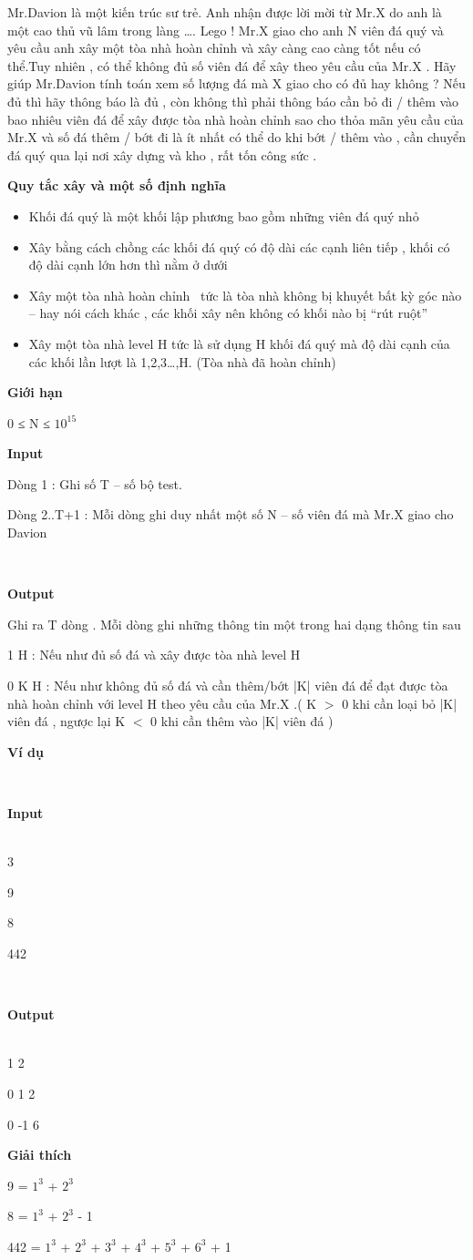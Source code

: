 

Mr.Davion là một kiến trúc sư trẻ. Anh nhận được lời mời từ Mr.X do anh là một cao thủ vũ lâm trong làng …. Lego ! Mr.X giao cho anh N viên đá quý và yêu cầu anh xây một tòa nhà hoàn chỉnh và xây càng cao càng tốt nếu có thể.Tuy nhiên , có thể không đủ số viên đá để xây theo yêu cầu của Mr.X . Hãy giúp Mr.Davion tính toán xem số lượng đá mà X giao cho có đủ hay không ? Nếu đủ thì hãy thông báo là đủ , còn không thì phải thông báo cần bỏ đi / thêm vào bao nhiêu viên đá để xây được tòa nhà hoàn chỉnh sao cho thỏa mãn yêu cầu của Mr.X và số đá thêm / bớt đi là ít nhất có thể do khi bớt / thêm vào , cần chuyển đá quý qua lại nơi xây dựng và kho , rất tốn công sức .

\textbf{Quy tắc xây và một số định nghĩa}
\begin{itemize}
	\item Khối đá quý là một khối lập phương bao gồm những viên đá quý nhỏ 
	\item Xây bằng cách chồng các khối đá quý có độ dài các cạnh liên tiếp , khối có độ dài cạnh lớn hơn thì nằm ở dưới
	\item Xây một tòa nhà hoàn chỉnh  tức là tòa nhà không bị khuyết bất kỳ góc nào – hay nói cách khác , các khối xây nên không có khối nào bị “rút ruột”
	\item Xây một tòa nhà level H tức là sử dụng H khối đá quý mà độ dài cạnh của các khối lần lượt là 1,2,3…,H. (Tòa nhà đã hoàn chỉnh)
\end{itemize}

\textbf{Giới hạn }

0 ≤ N ≤ $10^{15}$

\textbf{Input }

Dòng 1 : Ghi số T – số bộ test.

Dòng 2..T+1 : Mỗi dòng ghi duy nhất một số N – số viên đá mà Mr.X giao cho Davion

 

\textbf{Output }

Ghi ra T dòng . Mỗi dòng ghi những thông tin một trong hai dạng thông tin sau

1 H : Nếu như đủ số đá và xây được tòa nhà level H

0 K H : Nếu như không đủ số đá và cần thêm/bớt |K| viên đá để đạt được tòa nhà hoàn chỉnh với level H theo yêu cầu của Mr.X .( K $>$ 0 khi cần loại bỏ |K| viên đá , ngược lại K $<$ 0 khi cần thêm vào |K| viên đá )

\textbf{Ví dụ }

 

\textbf{Input}
\\ 

3

9

8

442

 

\textbf{Output}
\\ 

1 2

0 1 2

0 -1 6

\textbf{Giải thích}

9 = $1^{3}$ + $2^{3}$

8 = $1^{3}$ + $2^{3}$ - 1

442 = $1^{3}$ + $2^{3}$ + $3^{3}$ + $4^{3}$ + $5^{3}$ + $6^{3}$ + 1
